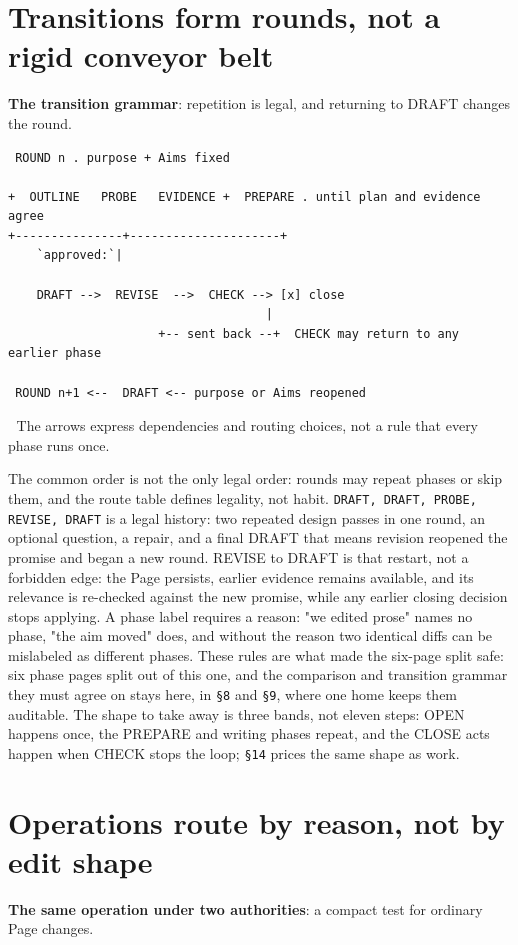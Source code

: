 \section{Transitions form rounds, not a rigid conveyor belt}
\textbf{The transition grammar}: repetition is legal, and returning to DRAFT changes the round.

\begin{verbatim}
 ROUND n . purpose + Aims fixed

+  OUTLINE   PROBE   EVIDENCE +  PREPARE . until plan and evidence agree
+---------------+---------------------+
    `approved:`|

    DRAFT -->  REVISE  -->  CHECK --> [x] close
                                    |
                     +-- sent back --+  CHECK may return to any earlier phase

 ROUND n+1 <--  DRAFT <-- purpose or Aims reopened
\end{verbatim}
📌 The arrows express dependencies and routing choices, not a rule that every phase runs once.

The common order is not the only legal order: rounds may repeat phases or skip them, and the route table defines legality, not habit. \texttt{DRAFT, DRAFT, PROBE, REVISE, DRAFT} is a legal history: two repeated design passes in one round, an optional question, a repair, and a final DRAFT that means revision reopened the promise and began a new round. REVISE to DRAFT is that restart, not a forbidden edge: the Page persists, earlier evidence remains available, and its relevance is re-checked against the new promise, while any earlier closing decision stops applying. A phase label requires a reason: "we edited prose" names no phase, "the aim moved" does, and without the reason two identical diffs can be mislabeled as different phases. These rules are what made the six-page split safe: six phase pages split out of this one, and the comparison and transition grammar they must agree on stays here, in \texttt{§8} and \texttt{§9}, where one home keeps them auditable. The shape to take away is three bands, not eleven steps: OPEN happens once, the PREPARE and writing phases repeat, and the CLOSE acts happen when CHECK stops the loop; \texttt{§14} prices the same shape as work.


\section{Operations route by reason, not by edit shape}
\textbf{The same operation under two authorities}: a compact test for ordinary Page changes.

